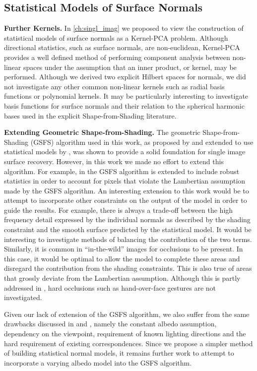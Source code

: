 \subsection{Statistical Models of Surface Normals}
\textbf{Further Kernels.} In \cref{ch:singl_imag} we proposed to view the 
construction of statistical models of surface normals as a Kernel-PCA problem.
Although directional statistics, such as surface normals, are non-euclidean,
Kernel-PCA provides a well defined method of performing component analysis
between non-linear spaces under the assumption that an inner product, or kernel,
may be performed. Although we derived two explicit Hilbert spaces for normals,
we did not investigate any other common non-linear kernels such as radial
basis functions or polynomial kernels. It may be particularly interesting
to investigate basis functions for surface normals and their relation to
the spherical harmonic bases used in the explicit Shape-from-Shading
literature.

\textbf{Extending Geometric Shape-from-Shading.} 
The geometric Shape-from-Shading (GSFS) algorithm used in this work, as proposed
by \citet{worthington1999new} and extended to use statistical models by
\citet{smith2010estimating}, was shown to provide a solid foundation for
single image surface recovery. However, in this work we made no effort to extend
this algorithm. For example, in \citet{smith2008facial} the GSFS algorithm
is extended to include robust statistics in order to account for pixels
that violate the Lambertian assumption made by the GSFS algorithm. An interesting
extension to this work would be to attempt to incorporate other constraints on
the output of the model in order to guide the results. For example, there is
always a trade-off between the high frequency detail expressed by the individual
normals as described by the shading constraint and the smooth surface predicted
by the statistical model. It would be interesting to investigate methods
of balancing the contribution of the two terms. Similarly, it is common in
``in-the-wild'' images for occlusions to be present. In this case, it would be
optimal to allow the model to complete these areas and disregard the contribution
from the shading constraints. This is also true of areas that grossly deviate
from the Lambertian assumption. Although this is partly addressed in 
\citet{smith2008facial}, hard occlusions such as hand-over-face gestures
are not investigated.

Given our lack of extension of the GSFS algorithm, we also suffer from the
same drawbacks discussed in \citet{smith2010estimating} and 
\citet{smith2008facial}, namely the constant albedo assumption, dependency
on the viewpoint, requirement of known lighting directions and the 
hard requirement of existing correspondences. Since
we propose a simpler method of building statistical normal models, it remains
further work to attempt to incorporate a varying albedo model into the GSFS
algorithm. 

